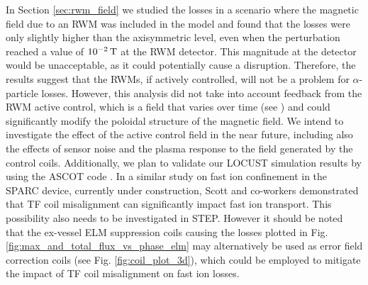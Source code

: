 \documentclass[10pt, a4paper, twoside]{article}
\begin{document}
In Section \ref{sec:rwm_field} we studied the losses in a scenario where the magnetic field due to an RWM was included in the model and found that the losses were only slightly higher than the axisymmetric level, even when the perturbation reached a value of $10^{-2}\text{\,T}$ at the RWM detector. This magnitude at the detector would be unacceptable, as it could potentially cause a disruption. Therefore, the results suggest that the RWMs, if actively controlled, will not be a problem for $\alpha$-particle losses. However, this analysis did not take into account feedback from the RWM active control, which is a field that varies over time (see \cite{xia2023}) and could significantly modify the poloidal structure of the magnetic field. We intend to investigate the effect of the active control field in the near future, including also the effects of sensor noise and the plasma response to the field generated by the control coils. Additionally, we plan to validate our LOCUST simulation results by using the ASCOT code \cite{hirvijoki2014}. In a similar study on fast ion confinement in the SPARC device, currently under construction, Scott and co-workers \cite{Scott2020} demonstrated that TF coil misalignment can significantly impact fast ion transport. This possibility also needs to be investigated in STEP. However it should be noted that the ex-vessel ELM suppression coils causing the losses plotted in Fig. \ref{fig:max_and_total_flux_vs_phase_elm} may alternatively be used as error field correction coils (see Fig. \ref{fig:coil_plot_3d}), which could be employed to mitigate the impact of TF coil misalignment on fast ion losses. 

\end{document}
